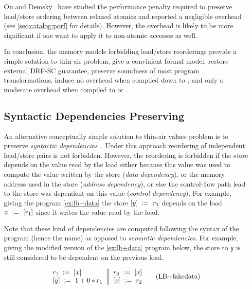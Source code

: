 Ou and Demsky~\cite{Ou-Demsky:OOPSLA18} have studied 
the performance penalty required to preserve
load/store ordering between relaxed atomics 
and reported a negligible overhead 
(see \ref{sec:catalog:porf} for details).
However, the overhead is likely to be more significant
if one want to apply it to non-atomic accesses as well. 

In conclusion, the memory models forbidding load/store reorderings
provide a simple solution to thin-air problem, 
give a convinient formal model,  
restore external DRF-SC guarantee, preserve soundness of 
most program transformations, induce no overhead when 
compiled down to \xTSO, and only a moderate overhead 
when compiled to \ARM or \POWER.

\subsection{Syntactic Dependencies Preserving}
\label{sec:analysis:deprf}

An alternative conceptually simple solution 
to thin-air values problem is to preserve 
\emph{syntactic dependencies}~\cite{Boehm-Demsky:MSPC14, Alglave-al:ASPLOS18}.
Under this approach reordering of independent load/store pairs is not forbidden.
However, the reordering is forbidden if the store depends on the value 
read by the load either because this value 
was used to compute the value written by the store (\emph{data dependency}), 
or the memory address used in the store (\emph{address dependency}),
or else the control-flow path lead to the store was dependent
on this value (\emph{control dependency}).
For example, giving the program \ref{ex:lb+data} 
the store $[y]\;:=_{}\;r_1$ depends 
on the load $x\;:=_{}\;[r_1]$ since 
it writes the value read by the load.

Note that these kind of dependencies are computed following the 
syntax of the program (hence the name) as opposed 
to \emph{semantic dependencies}.
For example, giving the modified version of the \ref{ex:lb+data} program below, 
the store to \texttt{y} is still considered to be dependent on the previous load. 

\begin{equation*}
\inarrII{
  \readInst{}{r_1}{x}           \\
  \writeInst{}{y}{1 + 0 * r_1}  \\
}{
  \readInst{}{r_2}{x}      \\
  \writeInst{}{x}{r_2}     \\
}
\tag{LB+fakedata}\label{ex:lb+fakedata}
\end{equation*}

